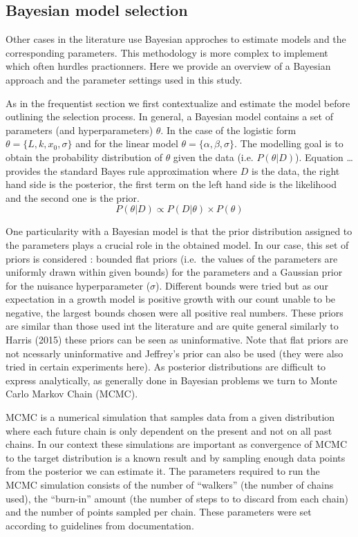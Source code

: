 \documentclass[]{article}
\begin{document}
\hypertarget{bayesian-model-selection}{%
\subsection{Bayesian model selection}\label{bayesian-model-selection}}

Other cases in the literature use Bayesian approches to estimate models
and the corresponding parameters. This methodology is more complex to
implement which often hurdles practionners. Here we provide an overview
of a Bayesian approach and the parameter settings used in this study.

As in the frequentist section we first contextualize and estimate the
model before outlining the selection process. In general, a Bayesian
model contains a set of parameters (and hyperparameters) \(\theta\). In
the case of the logistic form \(\theta = \{L, k, x_0, \sigma\}\) and for
the linear model \(\theta = \{\alpha, \beta, \sigma\}\). The modelling
goal is to obtain the probability distribution of \(\theta\) given the
data (i.e. \(P(\theta|D)\)). Equation \ldots{} provides the standard
Bayes rule approximation where \(D\) is the data, the right hand side is
the posterior, the first term on the left hand side is the likelihood
and the second one is the prior.
\[P(\theta|D) \propto P(D|\theta) \times P(\theta)\]

One particularity with a Bayesian model is that the prior distribution
assigned to the parameters plays a crucial role in the obtained model.
In our case, this set of priors is considered : bounded flat priors
(i.e.~the values of the parameters are uniformly drawn within given
bounds) for the parameters and a Gaussian prior for the nuisance
hyperparameter (\(\sigma\)). Different bounds were tried but as our
expectation in a growth model is positive growth with our count unable
to be negative, the largest bounds chosen were all positive real
numbers. These priors are similar than those used int the literature and
are quite general similarly to Harris (2015) these priors can be seen as
uninformative. Note that flat priors are not ncessarly uninformative and
Jeffrey's prior can also be used (they were also tried in certain
experiments here). As posterior distributions are difficult to express
analytically, as generally done in Bayesian problems we turn to Monte
Carlo Markov Chain (MCMC).

MCMC is a numerical simulation that samples data from a given
distribution where each future chain is only dependent on the present
and not on all past chains. In our context these simulations are
important as convergence of MCMC to the target distribution is a known
result and by sampling enough data points from the posterior we can
estimate it. The parameters required to run the MCMC simulation consists
of the number of ``walkers'' (the number of chains used), the
``burn-in'' amount (the number of steps to to discard from each chain)
and the number of points sampled per chain. These parameters were set
according to guidelines from documentation.
\end{document}
